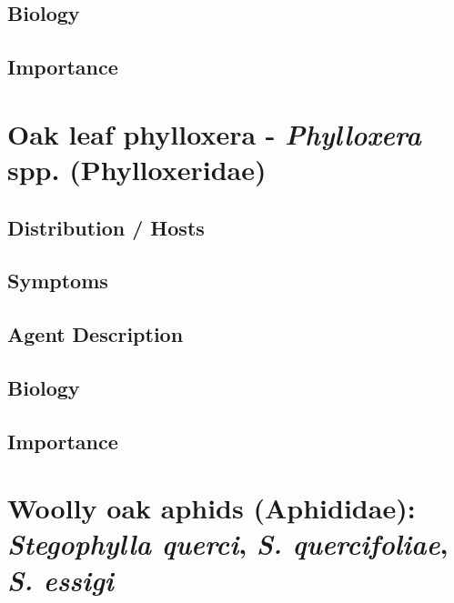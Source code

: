 \documentclass[
]{book}
\begin{document}
\subsection*{Biology}\label{biology-12}

\subsection*{Importance}\label{importance-12}

\section*{\texorpdfstring{Oak leaf phylloxera - \emph{Phylloxera} spp. (Phylloxeridae)}{Oak leaf phylloxera - Phylloxera spp. (Phylloxeridae)}}\label{oak-leaf-phylloxera---phylloxera-spp.-phylloxeridae}

\subsection*{Distribution / Hosts}\label{distribution-hosts-13}

\subsection*{Symptoms}\label{symptoms-13}

\subsection*{Agent Description}\label{agent-description-13}

\subsection*{Biology}\label{biology-13}

\subsection*{Importance}\label{importance-13}

\section*{\texorpdfstring{Woolly oak aphids (Aphididae): \emph{Stegophylla querci}, \emph{S. quercifoliae}, \emph{S. essigi}}{Woolly oak aphids (Aphididae): Stegophylla querci, S. quercifoliae, S. essigi}}\label{woolly-oak-aphids-aphididae-stegophylla-querci-s.-quercifoliae-s.-essigi}
\end{document}
